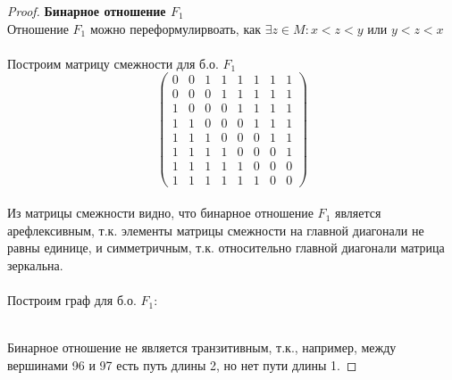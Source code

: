 \pagebreak
\begin{proof} \textbf{Бинарное отношение $F_1$}\\
Отношение $F_1$ можно переформулирвоать, как $\exists z \in M: x < z < y \text{ или } y < z < x$
\\ \\
Построим матрицу смежности для б.о. $F_1$
$$ \left( \begin{array}{cccccccc}
		   0 &0 &1 &1 &1 &1 &1 &1 
        \\0 &0 &0 &1 &1 &1 &1 &1
        \\1 &0 &0 &0 &1 &1 &1 &1
        \\1 &1 &0 &0 &0 &1 &1 &1
        \\1 &1 &1 &0 &0 &0 &1 &1
        \\1 &1 &1 &1 &0 &0 &0 &1
        \\1 &1 &1 &1 &1 &0 &0 &0
        \\1 &1 &1 &1 &1 &1 &0 &0 \end{array} \right) $$\\
Из матрицы смежности видно, что бинарное отношение $F_1$ является арефлексивным, т.к. элементы матрицы смежности на главной диагонали не равны единице, и симметричным, т.к. относительно главной диагонали матрица зеркальна.
\\ \\
Построим граф для б.о. $F_1$:

\\
Бинарное отношение не является транзитивным, т.к., например, между вершинами 96 и 97 есть путь длины 2, но нет пути длины 1.
\end{proof}

